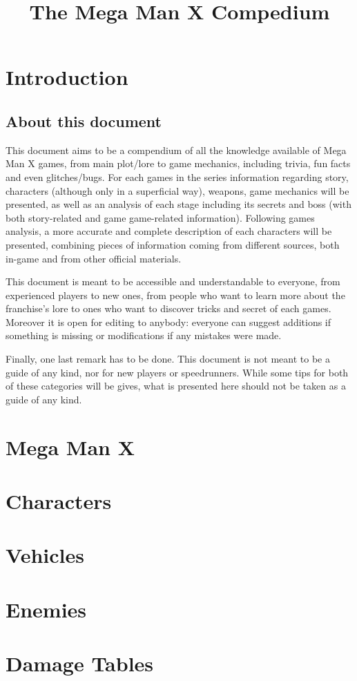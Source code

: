 \documentclass[openany]{report}
\title{The Mega Man X Compedium}
\begin{document}
\maketitle
\tableofcontents

\chapter{Introduction}
	\section{About this document}
	
	This document aims to be a compendium of all the knowledge available of Mega Man X games, from main plot/lore to game mechanics, including trivia, fun facts and even glitches/bugs. For each games in the series information regarding story, characters (although only in a superficial way), weapons, game mechanics will be presented, as well as an analysis of each stage including its secrets and boss (with both story-related and game game-related information). Following games analysis, a more accurate and complete description of each characters will be presented, combining pieces of information coming from different sources, both in-game and from other official materials.
	
	This document is meant to be accessible and understandable to everyone, from experienced players to new ones, from people who want to learn more about the franchise's lore to ones who want to discover tricks and secret of each games. Moreover it is open for editing to anybody: everyone can suggest additions if something is missing or modifications if any mistakes were made.
	
	Finally, one last remark has to be done. This document is not meant to be a guide of any kind, nor for new players or speedrunners. While some tips for both of these categories will be gives, what is presented here should not be taken as a guide of any kind.

\chapter{Mega Man X}
	



\appendix
	\chapter {Characters}
	
	\chapter {Vehicles}
	
	\chapter{Enemies}
	
	\chapter{Damage Tables}
	

 

\end{document}
